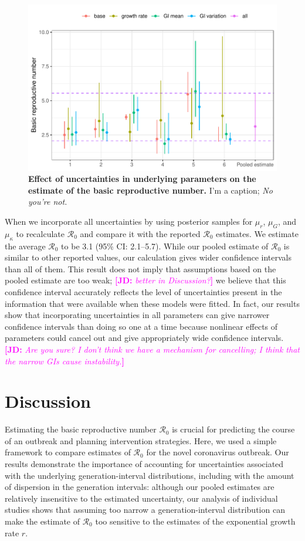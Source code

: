 \documentclass[12pt]{article}
\newcommand{\comment}[3]{\textcolor{#1}{\textbf{[#2: }\textsl{#3}\textbf{]}}}
\newcommand{\jd}[1]{\comment{magenta}{JD}{#1}}
\begin{document}
\begin{figure}[t]
\includegraphics[width=\textwidth]{compare_R0.pdf}
\caption{
\textbf{Effect of uncertainties in underlying parameters on the estimate of the basic reproductive number.}
I'm a caption; \emph{No you're not.}
}
\label{fig:R0}
\end{figure}

When we incorporate all uncertainties by using posterior samples for $\mu_r$, $\mu_G$, and $\mu_\kappa$ to recalculate $\mathcal R_0$ and compare it with the reported $\mathcal R_0$ estimates.
We estimate the average $\mathcal R_0$ to be 3.1 (95\% CI: 2.1--5.7).
While our pooled estimate of $\mathcal R_0$ is similar to other reported values, our calculation gives wider confidence intervals than all of them.
This result does not imply that assumptions based on the pooled estimate are too weak; \jd{better in Discussion?}
we believe that this confidence interval accurately reflects the level of uncertainties present in the information that were available when these models were fitted.
In fact, our results show that incorporating uncertainties in all parameters can give narrower confidence intervals than doing so one at a time because nonlinear effects of parameters could cancel out and give appropriately wide confidence intervals. \jd{Are you sure? I don't think we have a mechanism for cancelling; I think that the narrow GIs cause instability.}

\section{Discussion}

Estimating the basic reproductive number $\mathcal R_0$ is crucial for predicting the course of an outbreak and planning intervention strategies.
Here, we used a simple framework \citep{park2019practical} to compare  estimates of $\mathcal R_0$ for the novel coronavirus outbreak.
Our results demonstrate the importance of accounting for uncertainties associated with the underlying generation-interval distributions, including with the amount of dispersion in the generation intervals:
although our pooled estimates are relatively insensitive to the estimated uncertainty, our analysis of individual studies shows that assuming too narrow a generation-interval distribution can make the estimate of $\mathcal R_0$ too sensitive to the estimates of the exponential growth rate $r$.
\end{document}
